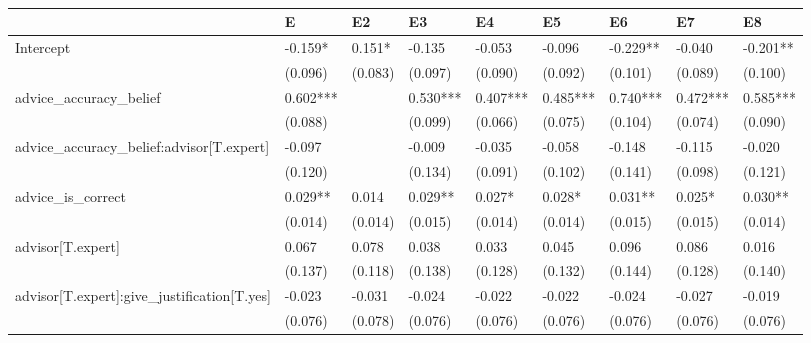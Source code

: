\begin{table}
\caption{}
\label{}
\begin{center}
\begin{tabular}{lllllllll}
\hline
                                             & E         & E2        & E3        & E4        & E5        & E6        & E7        & E8        \\
\hline
Intercept                                    & -0.159*   & 0.151*    & -0.135    & -0.053    & -0.096    & -0.229**  & -0.040    & -0.201**  \\
                                             & (0.096)   & (0.083)   & (0.097)   & (0.090)   & (0.092)   & (0.101)   & (0.089)   & (0.100)   \\
advice\_accuracy\_belief                     & 0.602***  &           & 0.530***  & 0.407***  & 0.485***  & 0.740***  & 0.472***  & 0.585***  \\
                                             & (0.088)   &           & (0.099)   & (0.066)   & (0.075)   & (0.104)   & (0.074)   & (0.090)   \\
advice\_accuracy\_belief:advisor[T.expert]   & -0.097    &           & -0.009    & -0.035    & -0.058    & -0.148    & -0.115    & -0.020    \\
                                             & (0.120)   &           & (0.134)   & (0.091)   & (0.102)   & (0.141)   & (0.098)   & (0.121)   \\
advice\_is\_correct                          & 0.029**   & 0.014     & 0.029**   & 0.027*    & 0.028*    & 0.031**   & 0.025*    & 0.030**   \\
                                             & (0.014)   & (0.014)   & (0.015)   & (0.014)   & (0.014)   & (0.015)   & (0.015)   & (0.014)   \\
advisor[T.expert]                            & 0.067     & 0.078     & 0.038     & 0.033     & 0.045     & 0.096     & 0.086     & 0.016     \\
                                             & (0.137)   & (0.118)   & (0.138)   & (0.128)   & (0.132)   & (0.144)   & (0.128)   & (0.140)   \\
advisor[T.expert]:give\_justification[T.yes] & -0.023    & -0.031    & -0.024    & -0.022    & -0.022    & -0.024    & -0.027    & -0.019    \\
                                             & (0.076)   & (0.078)   & (0.076)   & (0.076)   & (0.076)   & (0.076)   & (0.076)   & (0.076)   \\

\end{tabular}
\end{center}
\end{table}
